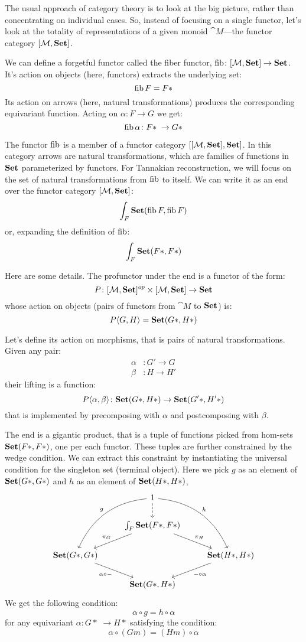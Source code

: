 \documentclass[DaoFP]{subfiles}
\begin{document}
The usual approach of category theory is to look at the big picture, rather than concentrating on individual cases. So, instead of focusing on a single functor, let's look at the totality of representations of a given monoid $\cat M$---the functor category $[\mathcal{M}, \mathbf{Set}]$. 

We can define a forgetful functor called the fiber functor, $\mathop{\text{fib}} \colon [\mathcal{M}, \mathbf{Set}] \to \mathbf{Set}$. It's action on objects (here, functors) extracts the underlying set:
\[ \mathop{\text{fib}} F = F *\]
Its action on arrows (here, natural transformations) produces the corresponding equivariant function. Acting on $\alpha \colon F \to G$ we get:
\[\mathop{\mathop{\text{fib}}} \alpha \colon F *\; \to G * \]

The functor $\mathop{\text{fib}}$ is a member of a functor category $[[\mathcal{M}, \mathbf{Set}], \mathbf{Set}]$. In this category arrows are natural transformations, which are families of functions in $\mathbf{Set}$ parameterized by functors. For Tannakian reconstruction, we will focus on the set of natural transformations from $\mathop{\text{fib}}$ to itself. We can write it as an end over the functor category $[\mathcal{M}, \mathbf{Set}]$:
\[ \int_F \mathbf{Set}(\mathop{\text{fib}} F, \mathop{\text{fib}} F) \]
or, expanding the definition of $\mathop{\text{fib}}$:
\[ \int_F \mathbf{Set}(F *, F *) \]

Here are some details. The profunctor under the end is a functor of the form:
\[ P \colon [\mathcal{M}, \mathbf{Set}]^{op} \times [\mathcal{M}, \mathbf{Set}] \to \mathbf{Set} \]
whose action on objects (pairs of functors from $\cat M$ to $\mathbf{Set}$)  is:
\[ P \langle G, H \rangle = \mathbf{Set} (G *, H *) \]

Let's define its action on morphisms, that is pairs of natural transformations. Given any pair:
\begin{align*}
\alpha &\colon G' \to G \\ 
\beta &\colon H \to H'
\end{align*}
their lifting is a function:
\[ P\langle \alpha, \beta \rangle \colon  \mathbf{Set} ( G*, H*)  \to \mathbf{Set} (G'*, H'*)\] that is implemented by precomposing with $\alpha$ and postcomposing with $\beta$. 

The end is a gigantic product, that is a tuple of functions picked from hom-sets $\mathbf{Set} ( F*, F*)$, one per each functor. These tuples are further constrained by the wedge condition. We can extract this constraint by instantiating the universal condition for the singleton set (terminal object). Here we pick $g$ as an element of $\mathbf{Set} (G*, G*)$ and $h$ as an element of $\mathbf{Set} (H*, H*)$,
\[
 \begin{tikzcd}
 & 1
 \arrow[ddl, bend right,  "g"']
 \arrow[ddr, bend left, "h"]
 \arrow[d, dashed, ""]
 \\
 & \int_F \Set (F *, F *)
 \arrow[dl, "\pi_G"']
 \arrow[dr, "\pi_H"]
 \\
 \Set(G *, G *)
 \arrow[dr, "\alpha \circ -"']
 && \Set (H *, H *)
  \arrow[dl, "- \circ \alpha"]
\\
 & \Set (G *, H *)
 \end{tikzcd}
\]
We get the following condition:
\[  \alpha \circ g = h \circ \alpha  \]
for any equivariant $\alpha \colon G *\; \to H *$ satisfying the condition:
\[ \alpha \circ (G m) = (H m) \circ \alpha \]
\end{document}

